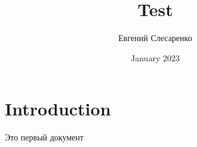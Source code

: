 \documentclass[a4paper,11pt]{article}
\title{Test}
\author{Евгений Слесаренко}
\date{January 2023}
\begin{document}
\maketitle

\section{Introduction}
Это первый документ
\end{document}
